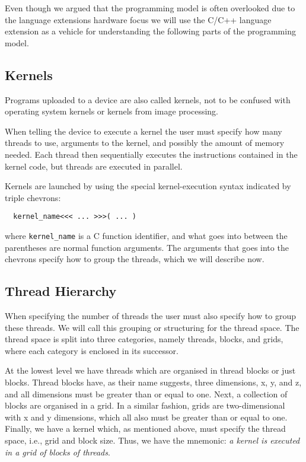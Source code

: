 Even though we argued that the programming model is often
overlooked due to the language extensions hardware focus we
will use the C/C++ language extension as a vehicle for
understanding the following parts of the programming model. 

\subsection{Kernels}

Programs uploaded to a device are also called kernels, not
to be confused with operating system kernels or kernels from
image processing.

When telling the device to execute a kernel the user must
specify how many threads to use, arguments to the kernel,
and possibly the amount of memory needed. Each thread then
sequentially executes the instructions contained in the
kernel code, but threads are executed in parallel.

Kernels are launched by using the special kernel-execution
syntax indicated by triple chevrons:
%
\begin{verbatim}
  kernel_name<<< ... >>>( ... )
\end{verbatim}
%
where \texttt{kernel\_name} is a C function identifier, and
what goes into between the parentheses are normal function
arguments. The arguments that goes into the chevrons specify
how to group the threads, which we will describe now.


\subsection{Thread Hierarchy}

%

%
When specifying the number of threads the user must also
specify how to group these threads. We will call this
grouping or structuring for the thread space. The thread
space is split into three categories, namely threads,
blocks, and grids, where each category is enclosed in its
successor.

At the lowest level we have threads which are organised in
thread blocks or just blocks. Thread blocks have, as their
name suggests, three dimensions, x, y, and z, and all
dimensions must be greater than or equal to one. Next, a
collection of blocks are organised in a grid.  In a similar
fashion, grids are two-dimensional with x and y dimensions,
which all also must be greater than or equal to one.
Finally, we have a kernel which, as mentioned above, must
specify the thread space, i.e., grid and block size. Thus,
we have the mnemonic: \emph{a kernel is executed in a grid
  of blocks of threads}.

